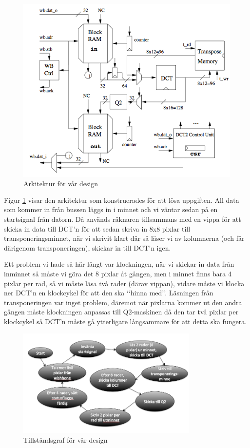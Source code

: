 \documentclass[a4paper]{article}
\begin{document}
\begin{figure}[h]
\centering
\includegraphics[scale=0.5]{architecture.png}
\caption{Arkitektur för vår design}
\label{fig:architecture}
\end{figure}

Figur \ref{fig:architecture} visar den arkitektur som konstruerades för
att lösa uppgiften. All data som kommer in från bussen läggs in i minnet
och vi väntar sedan på en startsignal från datorn. Då används räknaren
tillsammans med en vippa för att skicka in data till DCT\rq{}n för att
sedan skriva in 8x8 pixlar till transponeringsminnet, när vi skrivit
klart där så läser vi av kolumnerna (och får därigenom transponeringen),
skickar in till DCT\rq{}n igen.

Ett problem vi hade så här långt var klockningen, när vi skickar in data
från inminnet så måste vi göra det 8 pixlar åt gången, men i minnet
finns bara 4 pixlar per rad, så vi måste läsa två rader (därav vippan),
vidare måste vi klocka ner DCT\rq{}n en klockcykel för att den ska
\lq\lq{}hinna med\rq\rq{}. Läsningen från transponeringen var inget
problem, däremot när pixlarna kommer ut den andra gången måste
klockningen anpassas till Q2-maskinen då den tar två pixlar per
klockcykel så DCT\rq{}n måste gå ytterligare långsammare för att detta
ska fungera.

\begin{figure}[h]
\centering
\includegraphics[width=340px]{states.png}
\caption{Tillståndsgraf för vår design}
\label{fig:state}
\end{figure}
\end{document}

